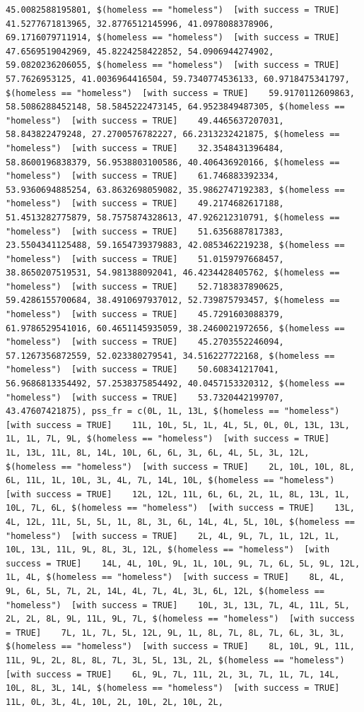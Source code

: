 \documentclass{tufte-book}\usepackage[]{graphicx}\usepackage[]{xcolor}
\makeatletter
\newenvironment{kframe}{%
 \def\at@end@of@kframe{}%
 \ifinner\ifhmode%
  \def\at@end@of@kframe{\end{minipage}}%
  \begin{minipage}{\columnwidth}%
 \fi\fi%
 \def\FrameCommand##1{\hskip\@totalleftmargin \hskip-\fboxsep
 \colorbox{shadecolor}{##1}\hskip-\fboxsep
     \hskip-\linewidth \hskip-\@totalleftmargin \hskip\columnwidth}%
 \MakeFramed {\advance\hsize-\width
   \@totalleftmargin\z@ \linewidth\hsize
   \@setminipage}}%
 {\par\unskip\endMakeFramed%
 \at@end@of@kframe}
\newenvironment{knitrout}{}{} %
\makeatother
\begin{document}
\begin{knitrout}
\begin{kframe}
\begin{verbatim}
45.0082588195801, $(homeless == "homeless")  [with success = TRUE]    41.5277671813965, 32.8776512145996, 41.0978088378906, 69.1716079711914, $(homeless == "homeless")  [with success = TRUE]    47.6569519042969, 45.8224258422852, 54.0906944274902, 59.0820236206055, $(homeless == "homeless")  [with success = TRUE]    57.7626953125, 41.0036964416504, 59.7340774536133, 60.9718475341797, $(homeless == "homeless")  [with success = TRUE]    59.9170112609863, 58.5086288452148, 58.5845222473145, 64.9523849487305, $(homeless == "homeless")  [with success = TRUE]    49.4465637207031, 58.843822479248, 27.2700576782227, 66.2313232421875, $(homeless == "homeless")  [with success = TRUE]    32.3548431396484, 58.8600196838379, 56.9538803100586, 40.406436920166, $(homeless == "homeless")  [with success = TRUE]    61.746883392334, 53.9360694885254, 63.8632698059082, 35.9862747192383, $(homeless == "homeless")  [with success = TRUE]    49.2174682617188, 51.4513282775879, 58.7575874328613, 47.926212310791, $(homeless == "homeless")  [with success = TRUE]    51.6356887817383, 23.5504341125488, 59.1654739379883, 42.0853462219238, $(homeless == "homeless")  [with success = TRUE]    51.0159797668457, 38.8650207519531, 54.981388092041, 46.4234428405762, $(homeless == "homeless")  [with success = TRUE]    52.7183837890625, 59.4286155700684, 38.4910697937012, 52.739875793457, $(homeless == "homeless")  [with success = TRUE]    45.7291603088379, 61.9786529541016, 60.4651145935059, 38.2460021972656, $(homeless == "homeless")  [with success = TRUE]    45.2703552246094, 57.1267356872559, 52.023380279541, 34.516227722168, $(homeless == "homeless")  [with success = TRUE]    50.608341217041, 56.9686813354492, 57.2538375854492, 40.0457153320312, $(homeless == "homeless")  [with success = TRUE]    53.7320442199707, 43.47607421875), pss_fr = c(0L, 1L, 13L, $(homeless == "homeless")  [with success = TRUE]    11L, 10L, 5L, 1L, 4L, 5L, 0L, 0L, 13L, 13L, 1L, 1L, 7L, 9L, $(homeless == "homeless")  [with success = TRUE]    1L, 13L, 11L, 8L, 14L, 10L, 6L, 6L, 3L, 6L, 4L, 5L, 3L, 12L, $(homeless == "homeless")  [with success = TRUE]    2L, 10L, 10L, 8L, 6L, 11L, 1L, 10L, 3L, 4L, 7L, 14L, 10L, $(homeless == "homeless")  [with success = TRUE]    12L, 12L, 11L, 6L, 6L, 2L, 1L, 8L, 13L, 1L, 10L, 7L, 6L, $(homeless == "homeless")  [with success = TRUE]    13L, 4L, 12L, 11L, 5L, 5L, 1L, 8L, 3L, 6L, 14L, 4L, 5L, 10L, $(homeless == "homeless")  [with success = TRUE]    2L, 4L, 9L, 7L, 1L, 12L, 1L, 10L, 13L, 11L, 9L, 8L, 3L, 12L, $(homeless == "homeless")  [with success = TRUE]    14L, 4L, 10L, 9L, 1L, 10L, 9L, 7L, 6L, 5L, 9L, 12L, 1L, 4L, $(homeless == "homeless")  [with success = TRUE]    8L, 4L, 9L, 6L, 5L, 7L, 2L, 14L, 4L, 7L, 4L, 3L, 6L, 12L, $(homeless == "homeless")  [with success = TRUE]    10L, 3L, 13L, 7L, 4L, 11L, 5L, 2L, 2L, 8L, 9L, 11L, 9L, 7L, $(homeless == "homeless")  [with success = TRUE]    7L, 1L, 7L, 5L, 12L, 9L, 1L, 8L, 7L, 8L, 7L, 6L, 3L, 3L, $(homeless == "homeless")  [with success = TRUE]    8L, 10L, 9L, 11L, 11L, 9L, 2L, 8L, 8L, 7L, 3L, 5L, 13L, 2L, $(homeless == "homeless")  [with success = TRUE]    6L, 9L, 7L, 11L, 2L, 3L, 7L, 1L, 7L, 14L, 10L, 8L, 3L, 14L, $(homeless == "homeless")  [with success = TRUE]    11L, 0L, 3L, 4L, 10L, 2L, 10L, 2L, 10L, 2L, 
\end{verbatim}
\end{kframe}
\end{knitrout}
\end{document}
